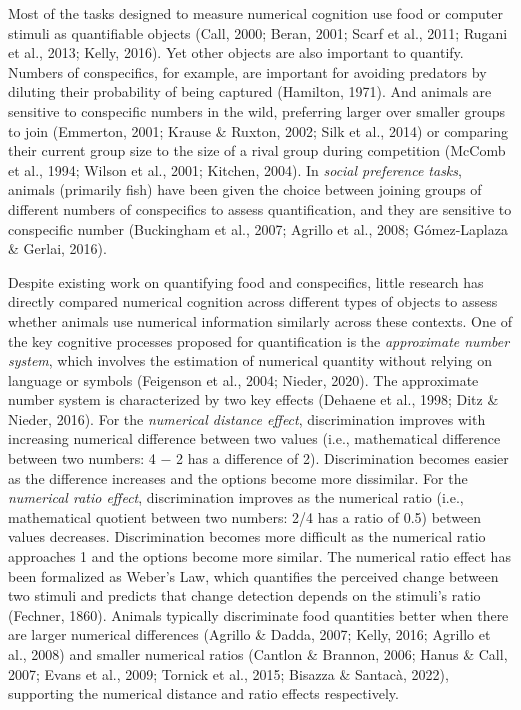 \documentclass[
  ,pub,floatsintext]{apa6}
\begin{document}
Most of the tasks designed to measure numerical cognition use food or computer stimuli as quantifiable objects (Call, 2000; Beran, 2001; Scarf et al., 2011; Rugani et al., 2013; Kelly, 2016). Yet other objects are also important to quantify. Numbers of conspecifics, for example, are important for avoiding predators by diluting their probability of being captured (Hamilton, 1971). And animals are sensitive to conspecific numbers in the wild, preferring larger over smaller groups to join (Emmerton, 2001; Krause \& Ruxton, 2002; Silk et al., 2014) or comparing their current group size to the size of a rival group during competition (McComb et al., 1994; Wilson et al., 2001; Kitchen, 2004). In \emph{social preference tasks}, animals (primarily fish) have been given the choice between joining groups of different numbers of conspecifics to assess quantification, and they are sensitive to conspecific number (Buckingham et al., 2007; Agrillo et al., 2008; Gómez-Laplaza \& Gerlai, 2016).

Despite existing work on quantifying food and conspecifics, little research has directly compared numerical cognition across different types of objects to assess whether animals use numerical information similarly across these contexts. One of the key cognitive processes proposed for quantification is the \emph{approximate number system}, which involves the estimation of numerical quantity without relying on language or symbols (Feigenson et al., 2004; Nieder, 2020). The approximate number system is characterized by two key effects (Dehaene et al., 1998; Ditz \& Nieder, 2016). For the \emph{numerical distance effect}, discrimination improves with increasing numerical difference between two values (i.e., mathematical difference between two numbers: 4 \(-\) 2 has a difference of 2). Discrimination becomes easier as the difference increases and the options become more dissimilar. For the \emph{numerical ratio effect}, discrimination improves as the numerical ratio (i.e., mathematical quotient between two numbers: 2/4 has a ratio of 0.5) between values decreases. Discrimination becomes more difficult as the numerical ratio approaches 1 and the options become more similar. The numerical ratio effect has been formalized as Weber's Law, which quantifies the perceived change between two stimuli and predicts that change detection depends on the stimuli's ratio (Fechner, 1860). Animals typically discriminate food quantities better when there are larger numerical differences (Agrillo \& Dadda, 2007; Kelly, 2016; Agrillo et al., 2008) and smaller numerical ratios (Cantlon \& Brannon, 2006; Hanus \& Call, 2007; Evans et al., 2009; Tornick et al., 2015; Bisazza \& Santacà, 2022), supporting the numerical distance and ratio effects respectively.
\end{document}
